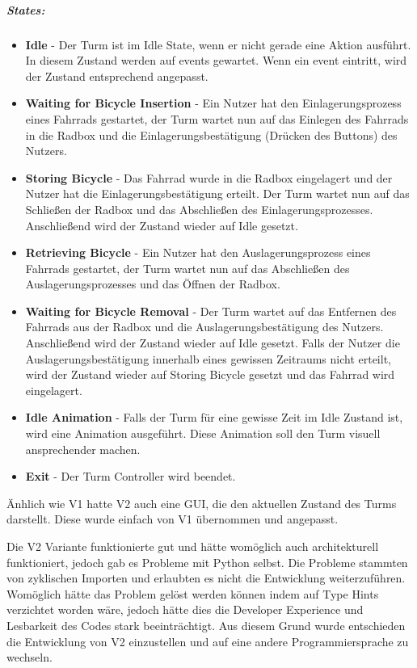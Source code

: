 \subparagraph{States:}
\begin{itemize}
  \item \textbf{Idle} - Der Turm ist im Idle State, wenn er nicht gerade eine Aktion ausführt. In diesem Zustand werden auf \Glspl{event} gewartet. Wenn ein \Gls{event} eintritt, wird der Zustand entsprechend angepasst.
  \item \textbf{Waiting for Bicycle Insertion} - Ein Nutzer hat den Einlagerungsprozess eines Fahrrads gestartet, der Turm wartet nun auf das Einlegen des Fahrrads in die Radbox und die Einlagerungsbestätigung (Drücken des Buttons) des Nutzers.
  \item \textbf{Storing Bicycle} - Das Fahrrad wurde in die Radbox eingelagert und der Nutzer hat die Einlagerungsbestätigung erteilt. Der Turm wartet nun auf das Schließen der Radbox und das Abschließen des Einlagerungsprozesses. Anschließend wird der Zustand wieder auf Idle gesetzt.
  \item \textbf{Retrieving Bicycle} - Ein Nutzer hat den Auslagerungsprozess eines Fahrrads gestartet, der Turm wartet nun auf das Abschließen des Auslagerungsprozesses und das Öffnen der Radbox.
  \item \textbf{Waiting for Bicycle Removal} - Der Turm wartet auf das Entfernen des Fahrrads aus der Radbox und die Auslagerungsbestätigung des Nutzers. Anschließend wird der Zustand wieder auf Idle gesetzt. Falls der Nutzer die Auslagerungsbestätigung innerhalb eines gewissen Zeitraums nicht erteilt, wird der Zustand wieder auf Storing Bicycle gesetzt und das Fahrrad wird eingelagert.
  \item \textbf{Idle Animation} - Falls der Turm für eine gewisse Zeit im Idle Zustand ist, wird eine Animation ausgeführt. Diese Animation soll den Turm visuell ansprechender machen.
  \item \textbf{Exit} - Der Turm Controller wird beendet.
\end{itemize}

Änhlich wie V1 hatte V2 auch eine \ac{GUI}, die den aktuellen Zustand des Turms darstellt. Diese wurde einfach von V1 übernommen und angepasst.

Die V2 Variante funktionierte gut und hätte womöglich auch architekturell funktioniert, jedoch gab es Probleme mit Python selbst. Die Probleme stammten von zyklischen Importen und erlaubten es nicht die Entwicklung weiterzuführen. Womöglich hätte das Problem gelöst werden können indem auf Type Hints verzichtet worden wäre, jedoch hätte dies die Developer Experience und Lesbarkeit des Codes stark beeinträchtigt. Aus diesem Grund wurde entschieden die Entwicklung von V2 einzustellen und auf eine andere Programmiersprache zu wechseln.